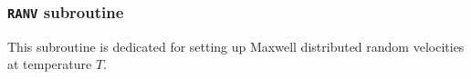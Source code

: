 
\subsubsection{\texttt{RANV} subroutine}

This subroutine is dedicated for setting up Maxwell distributed random velocities
at temperature $T$.
